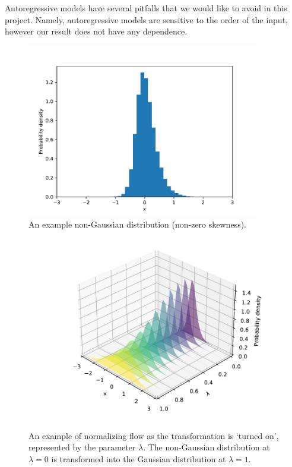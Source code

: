 Autoregressive models have several pitfalls that we would like to avoid in this project. Namely, autoregressive models are sensitive to the order of the input, however our result does not have any dependence. 
\begin{figure}[ht]
	\centering
	\includegraphics[width=0.9\textwidth]{plots/non_gauss.pdf}
	\caption{An example non-Gaussian distribution (non-zero skewness).}
	\label{fig:non-gauss}
\end{figure}
\begin{figure}[ht]
	\centering
	\includegraphics[width=\textwidth]{plots/flow_3d.pdf}
	\caption{An example of normalizing flow as the transformation is `turned on', represented by the parameter $\lambda$. The non-Gaussian distribution at $\lambda=0$ is transformed into the Gaussian distribution at $\lambda=1$.}
	\label{fig:NF}
\end{figure}